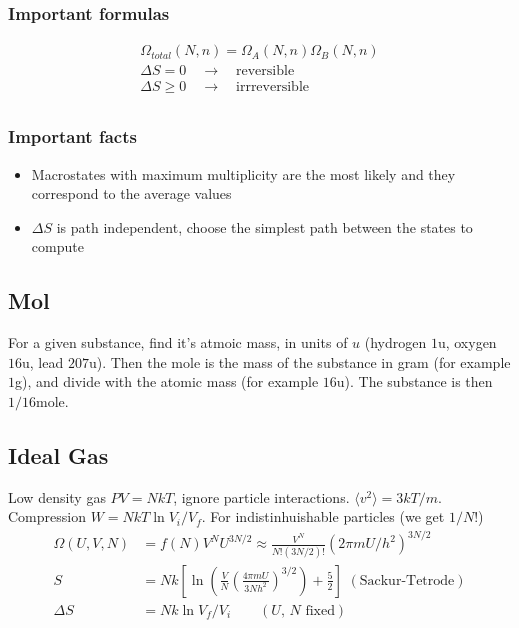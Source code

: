 \documentclass[a4paper, norsk, 8pt]{article}
\begin{document}
\begin{multicols*}{3}
\subsubsection*{\scriptsize Important formulas}
\begin{align*}
  \Omega_{total}(N, n) = \Omega_A(N, n)\Omega_B(N, n)\\
  \Delta S = 0 \quad \rightarrow \quad \text{reversible} \\
  \Delta S \geq 0 \quad \rightarrow \quad \text{irrreversible} \\
\end{align*}

\subsubsection*{\scriptsize Important facts}
\begin{itemize}
  \item Macrostates with maximum multiplicity are the most likely and they correspond to the average values
  \item $\Delta S$ is path independent, choose the simplest path between the states to compute
\end{itemize}

\subsection*{\footnotesize  Mol}
For a given substance, find it's atmoic mass, in units of $u$ (hydrogen $1$u, oxygen $16$u, lead $207$u). Then the mole is the mass of the substance in gram (for example $1$g), and divide with the atomic mass (for example $16$u). The substance is then $1/16$mole.


\subsection*{\footnotesize  Ideal Gas}
Low density gas $PV=NkT$, ignore particle interactions. $\langle v^2 \rangle = 3kT/m$. Compression $W =NkT\ln{V_i/V_f}$.
For indistinhuishable particles (we get $1/N!$)
\begin{align*}
  \Omega(U, V, N) &= f(N)V^NU^{3N/2} \approx \frac{V^N}{N!(3N/2)!}(2\pi mU/h^2)^{3N/2} \\
  S &= Nk\left[\ln\left( \frac{V}{N}\left( \frac{4\pi m U}{3Nh^2} \right)^{3/2}  \right) + \frac{5}{2}\right] \,\, (\text{Sackur-Tetrode})\\
  \Delta S &= Nk\ln{V_f/V_i} \qquad (\text{$U$, $N$ fixed})
\end{align*}



\end{multicols*}
\end{document}
